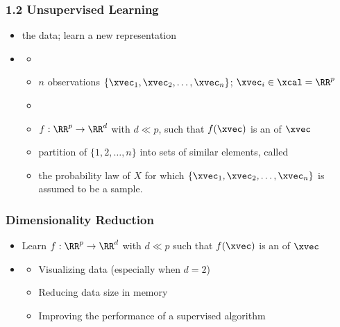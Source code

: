 \begin{frame}
  \frametitle{1.2 Unsupervised Learning}
  \begin{center}
  \end{center}
  \begin{itemize}
  \item {}  the data; learn a new representation
  \pause
  \item {}
    \begin{itemize}
    \item[]  
    \item[] $n$ observations $\{\xvec_1, \xvec_2, \dots, \xvec_n\}$; $\xvec_i \in \xcal = \RR^p$
      \vspace{.5em}
    \item[] 
    \pause
      \item {} $f : \RR^p \rightarrow \RR^d$ with
        $d \ll p$, such that $f(\xvec)$ is an  of $\xvec$
      \pause
      \item {} partition of $\{1, 2, \dots, n\}$ into sets
        of similar elements, called 
      \pause
      \item {} the probability law of $X$ for which
        $\{\xvec_1, \xvec_2, \dots, \xvec_n\}$ is assumed to be a sample.
    \end{itemize}
  \end{itemize}
\end{frame}

\begin{frame}
  \frametitle{Dimensionality Reduction}
  \begin{itemize}
  \item[] Learn $f : \RR^p \rightarrow \RR^d$ with $d \ll p$ such that
    $f(\xvec)$ is an  of $\xvec$
  \item {}
    \begin{itemize}
    \item Visualizing data (especially when $d=2$)
    \item Reducing data size in memory
    \item Improving the performance of a supervised algorithm
    \end{itemize}
  \end{itemize}
\end{frame}

